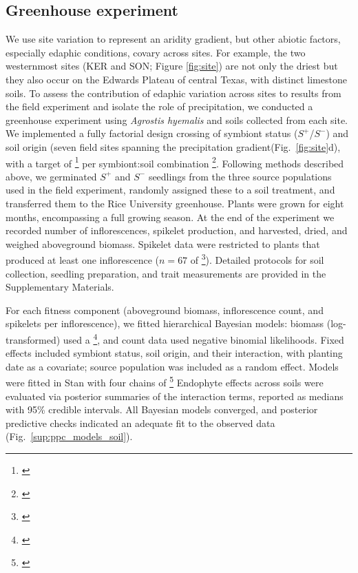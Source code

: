 \documentclass[12pt]{article}\usepackage[]{graphicx}\usepackage[dvipsnames]{xcolor}
\newcommand{\tom}[2]{{\color{red}{#1}}\footnote{\textit{\color{red}{#2}}}}
\begin{document}
\subsection*{Greenhouse experiment}
We use site variation to represent an aridity gradient, but other abiotic factors, especially edaphic conditions, covary across sites. 
For example, the two westernmost sites (KER and SON; Figure \ref{fig:site}) are not only the driest but they also occur on the Edwards Plateau of central Texas, with distinct limestone soils.
To assess the contribution of edaphic variation across sites to results from the field experiment and isolate the role of precipitation, we conducted a greenhouse experiment using \textit{Agrostis hyemalis} and soils collected from each site. 
We implemented a fully factorial design crossing of symbiont status ($S^{+}$/$S^{-}$) and soil origin (seven field sites spanning the precipitation gradient(Fig.~\ref{fig:site}d), with a target of \tom{14 replicates}{Is this right, considering two source populations? You do not report any results by source population so I would just lump them here.} per symbiont:soil combination \tom{(total $N = 196$ pots; Table~S1)}{Realized sample sizes were lower because plants died or failed to germinate.}.
Following methods described above, we germinated $S^{+}$ and $S^{-}$ seedlings from the three source populations used in the field experiment, randomly assigned these to a soil treatment, and transferred them to the Rice University greenhouse. 
Plants were grown for eight months, encompassing a full growing season.
At the end of the experiment we recorded number of inflorescences, spikelet production, and harvested, dried, and weighed aboveground biomass. 
Spikelet data were restricted to plants that produced at least one inflorescence ($n = 67$ of \tom{196}{We did not have 196 plants.}).
Detailed protocols for soil collection, seedling preparation, and trait measurements are provided in the Supplementary Materials.

For each fitness component (aboveground biomass, inflorescence count, and spikelets per inflorescence), we fitted hierarchical Bayesian models: biomass (log-transformed) used a \tom{Student-t likelihood}{I am curious why a t and not a normal...a reviewer may ask.}, and count data used negative binomial likelihoods. 
Fixed effects included symbiont status, soil origin, and their interaction, with planting date as a covariate; source population was included as a random effect. 
Models were fitted in Stan with four chains of \tom{6,000 iterations (2,000 warmup). }{Seems like a lot for a small data set and simple model.}
Endophyte effects across soils were evaluated via posterior summaries of the interaction terms, reported as medians with 95\% credible intervals.
All Bayesian models converged, and posterior predictive checks indicated an adequate fit to the observed data (Fig.~\ref{sup:ppc_models_soil}).
\end{document}

